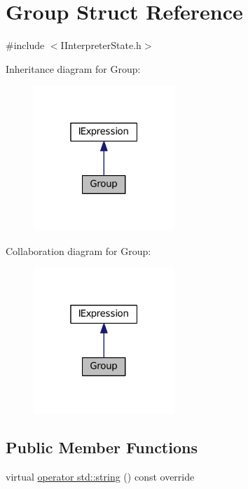 \hypertarget{struct_group}{}\section{Group Struct Reference}
\label{struct_group}


{\ttfamily \#include $<$I\+Interpreter\+State.\+h$>$}



Inheritance diagram for Group\+:
\nopagebreak
\begin{figure}[H]
\begin{center}
\leavevmode
\includegraphics[width=151pt]{struct_group__inherit__graph}
\end{center}
\end{figure}


Collaboration diagram for Group\+:
\nopagebreak
\begin{figure}[H]
\begin{center}
\leavevmode
\includegraphics[width=151pt]{struct_group__coll__graph}
\end{center}
\end{figure}
\subsection*{Public Member Functions}
\begin{DoxyCompactItemize}
\item 
virtual \hyperlink{struct_group_a0ae2d99c278c335a0cc1a892c1a6eeb4}{operator std\+::string} () const override
\end{DoxyCompactItemize}
